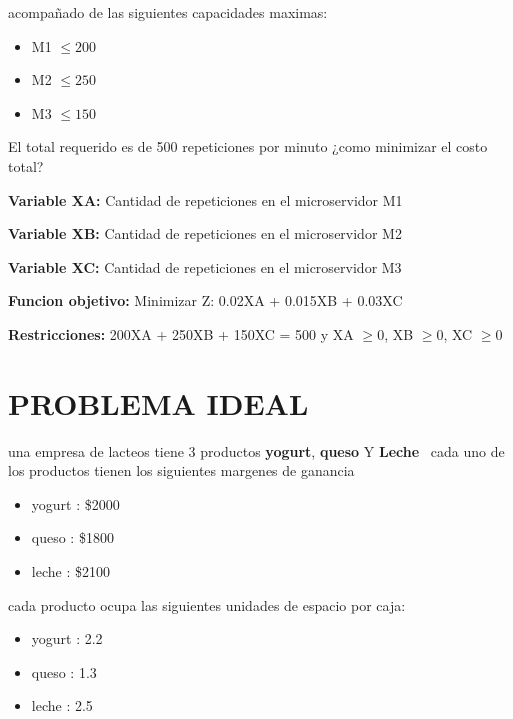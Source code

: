 \documentclass{article}
\begin{document}
\large acompañado de las siguientes capacidades maximas:

\begin{itemize}
    \item M1  $ \leq 200$
    \item M2  $ \leq 250$
    \item M3  $ \leq 150$
\end{itemize}

\large El total requerido es de 500 repeticiones por minuto ¿como minimizar el costo total?

\begin{center}
    \item \textbf{Variable XA:} Cantidad de repeticiones en el microservidor M1
    \item \textbf{Variable XB:} Cantidad de repeticiones en el microservidor M2
    \item \textbf{Variable XC:} Cantidad de repeticiones en el microservidor M3
    \item \textbf{Funcion objetivo:} Minimizar Z: 0.02XA + 0.015XB + 0.03XC
    \item \large \textbf{Restricciones:} 200XA + 250XB + 150XC = 500 y XA  $ \geq 0$, XB  $ \geq 0$, XC  $ \geq 0$
\end{center}


\vspace{5cm}
\section{PROBLEMA IDEAL}
\large
 una empresa de lacteos tiene 3 productos \textbf{yogurt}, \textbf{queso} Y \textbf{Leche}
\ cada uno de los productos tienen los siguientes margenes de ganancia

\begin{itemize}
    \item yogurt : \$2000
    \item queso : \$1800
    \item leche : \$2100
\end{itemize}

\large cada producto ocupa las siguientes unidades de espacio por caja: 

\begin{itemize}
    \item yogurt : 2.2
    \item queso : 1.3
    \item leche : 2.5
\end{itemize}
\end{document}
